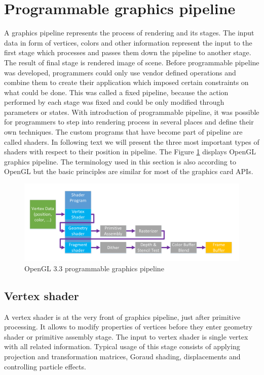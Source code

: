 \section{Programmable graphics pipeline}
\label{sec:pipeline}
A graphics pipeline represents the process of rendering and its stages. The
input data in form of vertices, colors and other information represent the input to the
first stage which processes and passes them down the pipeline to another stage.
The result of final stage is rendered image of scene. Before programmable
pipeline was developed, programmers could only use vendor defined operations and
combine them to create their application which imposed certain constraints on
what could be done. This was called a fixed pipeline, because the action
performed by each stage was fixed and could be only modified through parameters
or states. With introduction of programmable pipeline, it was possible for
programmers to step into rendering process in several places and define their
own techniques. The custom programs that have become part of pipeline are called
shaders. In following text we will present the three most important types of
shaders with respect to their position in pipeline. The Figure \ref{fig:OpenGLPipeline} displays OpenGL graphics pipeline. The terminology used in this section is also
according to OpenGL but the basic principles are similar for most of the graphics card APIs. 

\begin{figure}[ht]
	\centering
	\includegraphics[width=1\linewidth]{fig/OpenGLpipeline.pdf}
	\caption{OpenGL 3.3 programmable graphics pipeline}
	\label{fig:OpenGLPipeline}
\end{figure}

\subsection{Vertex shader}
A vertex shader is at the very front of graphics pipeline, just after primitive
processing. It allows to modify properties of vertices before they enter
geometry shader or primitive assembly stage. The input to vertex shader is
single vertex with all related information. Typical usage of this stage consists
of applying projection and transformation matrices, Goraud shading,
displacements and controlling particle effects.

